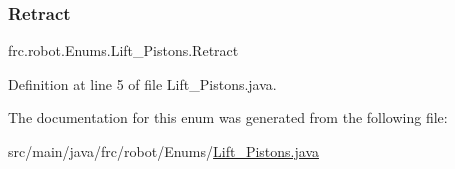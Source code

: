 \subsubsection{\texorpdfstring{Retract}{Retract}}
{\footnotesize\ttfamily frc.\+robot.\+Enums.\+Lift\+\_\+\+Pistons.\+Retract}



Definition at line 5 of file Lift\+\_\+\+Pistons.\+java.



The documentation for this enum was generated from the following file\+:\begin{DoxyCompactItemize}
\item 
src/main/java/frc/robot/\+Enums/\hyperlink{_lift___pistons_8java}{Lift\+\_\+\+Pistons.\+java}\end{DoxyCompactItemize}
